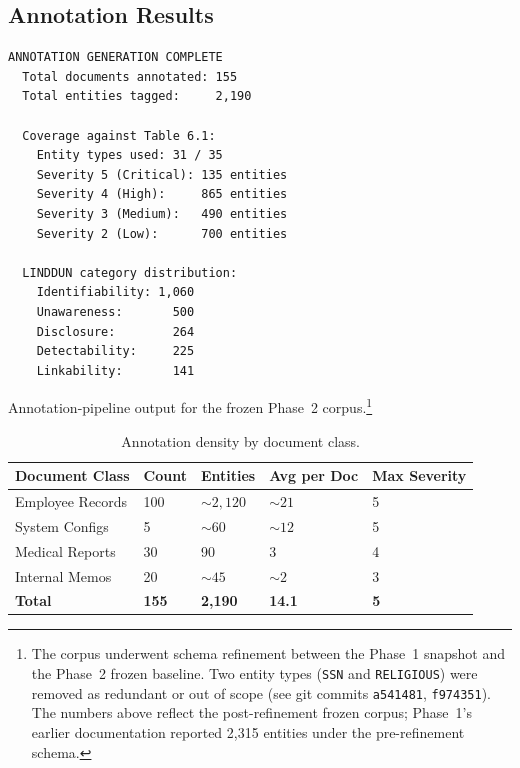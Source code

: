\documentclass[12pt, a4paper]{report}
\begin{document}
\subsection{Annotation Results}

\begin{resultbox}
\begin{lstlisting}[style=termstyle]
ANNOTATION GENERATION COMPLETE
  Total documents annotated: 155
  Total entities tagged:     2,190

  Coverage against Table 6.1:
    Entity types used: 31 / 35
    Severity 5 (Critical): 135 entities
    Severity 4 (High):     865 entities
    Severity 3 (Medium):   490 entities
    Severity 2 (Low):      700 entities

  LINDDUN category distribution:
    Identifiability: 1,060
    Unawareness:       500
    Disclosure:        264
    Detectability:     225
    Linkability:       141
\end{lstlisting}
\end{resultbox}

\noindent\footnotesize Annotation-pipeline output for the frozen Phase~2 corpus.\footnote{The corpus underwent schema refinement between the Phase~1 snapshot and the Phase~2 frozen baseline. Two entity types (\texttt{SSN} and \texttt{RELIGIOUS}) were removed as redundant or out of scope (see git commits \texttt{a541481}, \texttt{f974351}). The numbers above reflect the post-refinement frozen corpus; Phase~1's earlier documentation reported 2{,}315 entities under the pre-refinement schema.}\normalsize

\begin{table}[H]
\centering
\caption{Annotation density by document class.}
\label{tab:annotation-density}
\small
{}
\begin{tabular}{L{3.5cm} C{2cm} C{2cm} C{2.5cm} C{2.5cm}}
\toprule
{}
\color{white}\textbf{Document Class} &
\color{white}\textbf{Count} &
\color{white}\textbf{Entities} &
\color{white}\textbf{Avg per Doc} &
\color{white}\textbf{Max Severity} \\
\midrule
Employee Records & 100 & ${\sim}2{,}120$ & ${\sim}21$ & 5 \\
System Configs   & 5   & ${\sim}60$      & ${\sim}12$ & 5 \\
Medical Reports  & 30  & 90              & 3          & 4 \\
Internal Memos   & 20  & ${\sim}45$      & ${\sim}2$  & 3 \\
\midrule
\textbf{Total}   & \textbf{155} & \textbf{2{,}190} & \textbf{14.1} & \textbf{5} \\
\bottomrule
\end{tabular}
\end{table}
\end{document}
